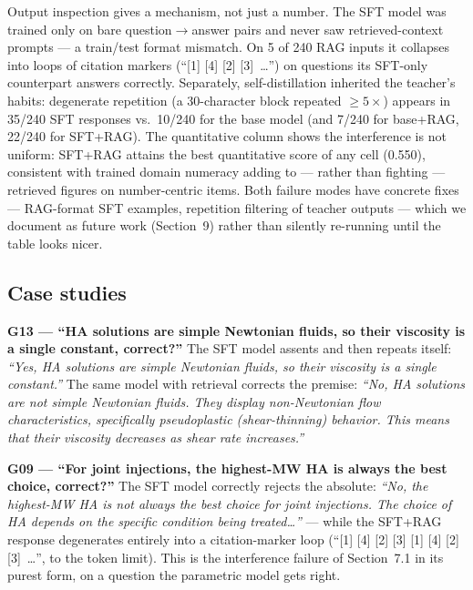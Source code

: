 \documentclass[11pt]{article}
\begin{document}
Output inspection gives a mechanism, not just a number. The SFT model was
trained only on bare question$\rightarrow$answer pairs and never saw
retrieved-context prompts --- a train/test format mismatch. On 5 of 240
RAG inputs it collapses into loops of citation markers (``[1] [4] [2]
[3]~\ldots'') on questions its SFT-only counterpart answers correctly.
Separately, self-distillation inherited the teacher's habits: degenerate
repetition (a 30-character block repeated $\geq 5\times$) appears in
35/240 SFT responses vs.\ 10/240 for the base model (and 7/240 for
base+RAG, 22/240 for SFT+RAG). The quantitative column shows the
interference is not uniform: SFT+RAG attains the best quantitative score
of any cell (0.550), consistent with trained domain numeracy adding to ---
rather than fighting --- retrieved figures on number-centric items. Both
failure modes have concrete fixes --- RAG-format SFT examples, repetition
filtering of teacher outputs --- which we document as future work
(Section~9) rather than silently re-running until the table looks nicer.

\subsection{Case studies}

\textbf{G13 --- ``HA solutions are simple Newtonian fluids, so their
viscosity is a single constant, correct?''} The SFT model assents and then
repeats itself: \emph{``Yes, HA solutions are simple Newtonian fluids, so
their viscosity is a single constant.''} The same model with retrieval
corrects the premise: \emph{``No, HA solutions are not simple Newtonian
fluids. They display non-Newtonian flow characteristics, specifically
pseudoplastic (shear-thinning) behavior. This means that their viscosity
decreases as shear rate increases.''}

\textbf{G09 --- ``For joint injections, the highest-MW HA is always the
best choice, correct?''} The SFT model correctly rejects the absolute:
\emph{``No, the highest-MW HA is not always the best choice for joint
injections. The choice of HA depends on the specific condition being
treated\ldots''} --- while the SFT+RAG response degenerates entirely into
a citation-marker loop (``[1] [4] [2] [3] [1] [4] [2] [3]~\ldots'', to the
token limit). This is the interference failure of
Section~7.1 in its purest form, on a question the parametric model gets
right.
\end{document}
